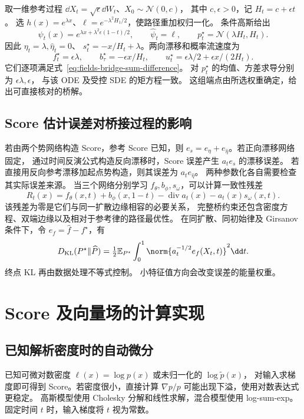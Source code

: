 \begin{example}[高斯参考上的指数终点权重]
取一维参考过程 \(\dd X_t=\sqrt\epsilon\dd W_t\)、\(X_0\sim\mathcal N(0,c)\)，
其中 \(c,\epsilon>0\)，记 \(H_t=c+\epsilon t\)。
选 \(h(x)=e^{\lambda x}\)、\(\ell=e^{-\lambda^2H_1/2}\)，使路径重加权归一化。
条件高斯给出
\[
 \psi_t(x)=e^{\lambda x+\lambda^2\epsilon(1-t)/2},\qquad
 \widehat\psi_t=\ell,\qquad
 p_t^\star=\mathcal N(\lambda H_t,H_t).
\]
因此 \(\eta_t=\lambda,\widehat\eta_t=0\)、
\(s_t^\star=-x/H_t+\lambda\)。两向漂移和概率流速度为
\[
 f_t^\star=\epsilon\lambda,\qquad
 b_\tau^\star=-\epsilon x/H_t,\qquad
 u_t^\star=\epsilon\lambda/2+\epsilon x/(2H_t).
\]
它们逐项满足式~\eqref{eq:fields-bridge-sum-difference}。
对 \(p_t^\star\) 的均值、方差求导分别为 \(\epsilon\lambda,\epsilon\)，
与该 ODE 及受控 SDE 的矩方程一致。
这组端点由所选权重确定，给出可直接核对的桥解。
\end{example}

\subsection{Score 估计误差对桥接过程的影响}

若由两个势网络构造 Score，参考 Score 已知，则
\(e_s=e_\eta+e_{\widehat\eta}\)。若正向漂移网络固定，
通过时间反演公式构造反向漂移时，Score 误差产生 \(a_te_s\) 的漂移误差。
若直接用反向参考漂移加起点势构造，则其误差为 \(a_te_{\widehat\eta}\)。
两种参数化各自需要检查其实际误差来源。
当三个网络分别学习 \(f_\theta,b_\phi,s_\omega\)，可以计算一致性残差
\[
 R_t(x)=f_\theta(x,t)+b_\phi(x,1-t)
                         -\operatorname{div}a_t(x)-a_t(x)s_\omega(x,t).
\]
该残差为零是它们与同一扩散边缘相容的必要关系，
完整桥约束还包含密度方程、双端边缘以及相对于参考律的路径最优性。
在同扩散、同初始律及 Girsanov 条件下，令 \(e_f=\widehat f-f^\star\)，有
\[
 D_{\mathrm{KL}}(P^\star\|\widehat P)
 =\tfrac12\mathbb E_{P^\star}\int_0^1
            \norm{a_t^{-1/2}e_f(X_t,t)}^2\dd t.
\]
终点 KL 再由数据处理不等式控制。
小特征值方向会改变误差的能量权重。

\section{Score 及向量场的计算实现}
\label{sec:fields-computation}

\subsection{已知解析密度时的自动微分}

已知可微对数密度 \(\ell(x)=\log p(x)\) 或未归一化的 \(\log\widetilde p(x)\)，
对输入求梯度即可得到 Score。若密度很小，直接计算 \(\nabla p/p\)
可能出现下溢，使用对数表达式更稳定。
高斯模型使用 Cholesky 分解和线性求解，混合模型使用 log-sum-exp。
固定时间 \(t\) 时，输入梯度将 \(t\) 视为常数。

